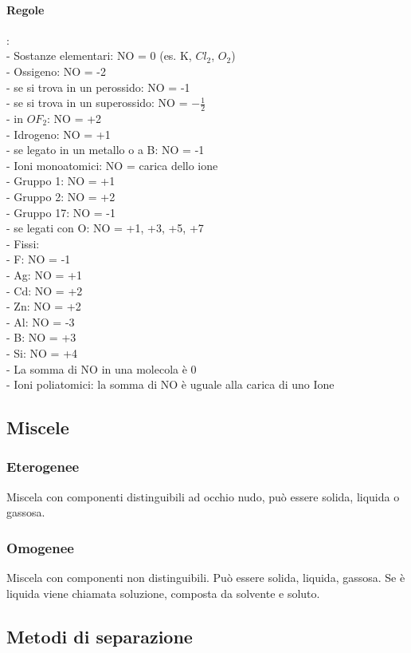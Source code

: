 \paragraph{Regole}: \\
- Sostanze elementari: NO = 0 (es. K, $Cl_2$, $O_2$)\\
- Ossigeno: NO = -2\\
\tab- se si trova in un perossido: NO = -1\\
\tab- se si trova in un superossido: NO = $-\frac{1}{2}$\\
\tab- in $OF_2$: NO = +2\\
- Idrogeno: NO = +1\\
\tab- se legato in un metallo o a B: NO = -1\\
- Ioni monoatomici: NO = carica dello ione\\
- Gruppo 1: NO = +1\\
- Gruppo 2: NO = +2\\
- Gruppo 17: NO = -1\\
\tab- se legati con O: NO = +1, +3, +5, +7\\
- Fissi:\\
\tab- F: NO = -1\\
\tab- Ag: NO = +1\\
\tab- Cd: NO = +2\\
\tab- Zn: NO = +2\\
\tab- Al: NO = -3\\
\tab- B: NO = +3\\
\tab- Si: NO = +4\\
- La somma di NO in una molecola è 0\\
- Ioni poliatomici: la somma di NO è uguale alla carica di uno Ione\\
\subsection{Miscele}
\subsubsection{Eterogenee}
Miscela con componenti distinguibili ad occhio nudo, può essere solida, liquida o gassosa.
\subsubsection{Omogenee}
Miscela con componenti non distinguibili. Può essere solida, liquida, gassosa. Se è liquida viene chiamata soluzione, composta da solvente e soluto.
\subsection{Metodi di separazione}
